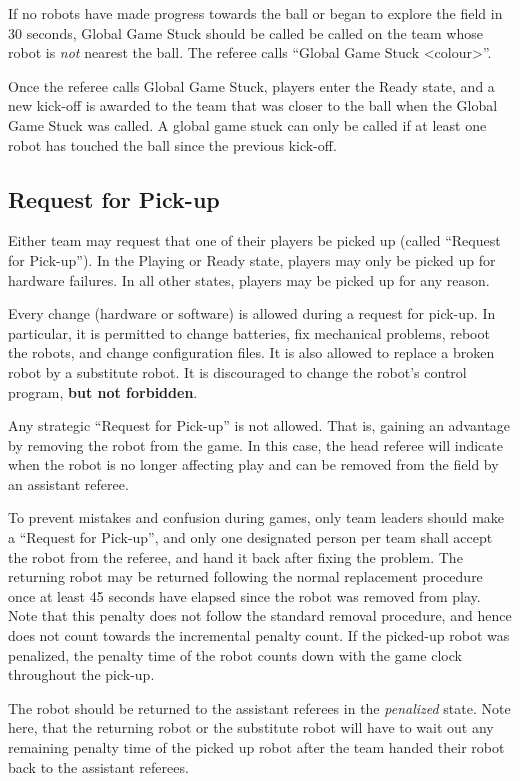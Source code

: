 \documentclass[12pt]{article}
\begin{document}
If no robots have made progress towards the ball or began to explore the field in 30 seconds, Global Game Stuck should be called be called on the team whose robot is \textit{not} nearest the ball.
The referee calls ``Global Game Stuck \textless colour\textgreater''.

Once the referee calls Global Game Stuck, players enter the Ready state, and a new kick-off is awarded to the team that was closer to the ball when the Global Game Stuck was called. A global game stuck can only be called if at least one robot has touched the ball since the previous kick-off.

\subsection{Request for Pick-up}
\label{sec:request_for_pickup}

Either team may request that one of their players be picked up (called ``Request for Pick-up'').
In the Playing or Ready state, players may only be picked up for hardware failures.
In all other states, players may be picked up for any reason.

Every change (hardware or software) is allowed during a request for pick-up. In particular,
it is permitted to change batteries, fix mechanical problems, reboot the robots, and change configuration files.
It is also allowed to replace a broken robot by a substitute robot.
It is discouraged to change the robot's control program, \textbf{but not forbidden}.

Any strategic ``Request for Pick-up'' is not allowed.
That is, gaining an advantage by removing the robot from the game.
In this case, the head referee will indicate when the robot is no longer affecting play and can be removed from the field by an assistant referee.

To prevent mistakes and confusion during games, only team leaders should make a ``Request for Pick-up'', and only one designated person per team shall accept the robot from the referee, and hand it back after fixing the problem.
The returning robot may be returned following the normal replacement procedure once at least 45 seconds have elapsed since the robot was removed from play.
Note that this penalty does not follow the standard removal procedure, and hence does not count towards the incremental penalty count.
If the picked-up robot was penalized, the penalty time of the robot counts down with the game clock throughout the pick-up.

The robot should be returned to the assistant referees in the \emph{penalized} state.
Note here, that the returning robot or the substitute robot will have to wait out any remaining penalty time of the picked up robot after the team handed their robot back to the assistant referees.
\end{document}

